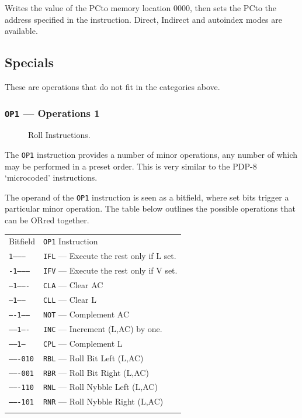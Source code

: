 \documentclass[11pt,a4paper,twocolumns]{article}
\newcommand\zebra{\rowcolors{2}{gray!10}{white}}
\newcommand\hex[1]{\textsf{#1}}
\newcommand\register[1]{\textsf{#1}}
\newcommand\A{\register{AC}}
\newcommand\Lreg{\register{L}}
\newcommand\Vreg{\register{V}}
\newcommand\PC{\register{PC}}
\begin{document}
Writes the value of the \PC to memory location \hex{0000}, then sets
the \PC to the address specified in the instruction. Direct, Indirect
and autoindex modes are available.

\subsection{Specials}

These are operations that do not fit in the categories above.

\subsubsection{{\tt OP1} — Operations 1}
\label{sec-op1}

\begin{figure}[tb]
  \centering
  
  \caption{\label{fig-roll}Roll Instructions.}
\end{figure}

The {\tt OP1} instruction provides a number of minor operations, any
number of which may be performed in a preset order. This is very
similar to the PDP-8 ‘microcoded’ instructions.

The operand of the {\tt OP1} instruction is seen as a bitfield, where
set bits trigger a particular minor operation. The table below
outlines the possible operations that can be ORred together.

\vspace{1em}\noindent\begin{center}
\zebra
\begin{tabular}{ll}
  Bitfield & {\tt OP1} Instruction \\\noalign{\smallskip}\hline\noalign{\smallskip}
  {\tt 1---------} & {\tt IFL} — Execute the rest only if \Lreg{} set.\\
  {\tt -1--------} & {\tt IFV} — Execute the rest only if \Vreg{} set.\\
  {\tt --1-------} & {\tt CLA} — Clear \A \\
  {\tt ---1------} & {\tt CLL} — Clear \Lreg \\
  {\tt ----1-----} & {\tt NOT} — Complement \A \\
  {\tt -----1----} & {\tt INC} — Increment (\Lreg,\A) by one. \\
  {\tt ------1---} & {\tt CPL} — Complement \Lreg \\
  {\tt -------010} & {\tt RBL} — Roll Bit Left (\Lreg,\A) \\
  {\tt -------001} & {\tt RBR} — Roll Bit Right (\Lreg,\A) \\
  {\tt -------110} & {\tt RNL} — Roll Nybble Left (\Lreg,\A) \\
  {\tt -------101} & {\tt RNR} — Roll Nybble Right (\Lreg,\A) \\\noalign{\smallskip}\hline\noalign{\smallskip}
\end{tabular}
\end{center}\vspace{1em}
\end{document}

